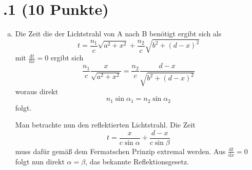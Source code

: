 \section*{\nr.1 \titone (10 Punkte)}
\begin{enumerate}[(a)]
\item Die Zeit die der Lichtstrahl von A nach B benötigt ergibt sich als
\begin{equation}
  t=\frac{n_1}{c}\sqrt{a^2+x^2}+\frac{n_2}{c}\sqrt{b^2+(d-x)^2}
\end{equation}
mit $\frac{\mathrm{d}t}{\mathrm{d}x}=0$ ergibt sich
\begin{equation}
  \frac{n_1}{c}\frac{x}{\sqrt{a^2+x^2}}=\frac{n_2}{c}\frac{d-x}{\sqrt{b^2+(d-x)^2}}
\end{equation}
woraus direkt
\begin{equation}
  n_1\sin \alpha_1 =n_2\sin \alpha_2
\end{equation}
folgt.

Man betrachte nun den reflektierten Lichtstrahl.
Die Zeit 
\begin{equation}
  t=\frac{x}{c\sin\alpha}+\frac{d-x}{c\sin\beta}
\end{equation}
muss dafür gemäß dem Fermatschen Prinzip extremal werden. Aus $\frac{\mathrm{d}t}{\mathrm{d}x}=0$ folgt nun direkt $\alpha=\beta$, das bekannte Reflektionsgesetz.


\end{enumerate}

